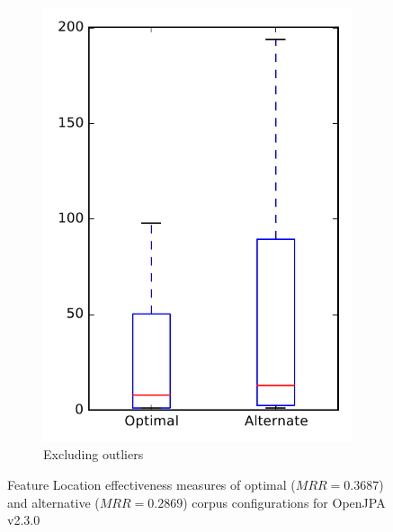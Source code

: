\begin{figure}
\begin{subfigure}{.4\textwidth}
        \includegraphics[height=0.4\textheight]{figures/combo/flt_rq2_openjpa_no_outlier}
        \caption{Excluding outliers}\label{fig:combo:flt:rq2:openjpa_no_outlier}
    \end{subfigure}
\caption{Feature Location effectiveness measures of optimal ($MRR=0.3687$) and alternative ($MRR=0.2869$) corpus configurations for OpenJPA v2.3.0}
\label{fig:combo:flt:rq2:openjpa}
\end{figure}
